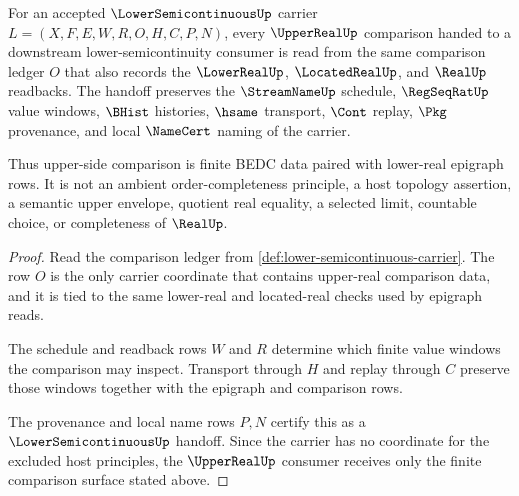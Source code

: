 \begin{theorem}
\label{thm:lowersemicontinuous-upperreal-handoff}
For an accepted $\LowerSemicontinuousUp$ carrier
$L=(X,F,E,W,R,O,H,C,P,N)$, every $\UpperRealUp$ comparison handed to a
downstream lower-semicontinuity consumer is read from the same comparison
ledger $O$ that also records the $\LowerRealUp$, $\LocatedRealUp$, and
$\RealUp$ readbacks. The handoff preserves the $\StreamNameUp$ schedule,
$\RegSeqRatUp$ value windows, $\BHist$ histories, $\hsame$ transport, $\Cont$
replay, $\Pkg$ provenance, and local $\NameCert$ naming of the carrier.

Thus upper-side comparison is finite BEDC data paired with lower-real
epigraph rows. It is not an ambient order-completeness principle, a host
topology assertion, a semantic upper envelope, quotient real equality, a
selected limit, countable choice, or completeness of $\RealUp$.
\end{theorem}
\begin{proof}
Read the comparison ledger from
\autoref{def:lower-semicontinuous-carrier}. The row $O$ is the only carrier
coordinate that contains upper-real comparison data, and it is tied to the
same lower-real and located-real checks used by epigraph reads.

The schedule and readback rows $W$ and $R$ determine which finite value
windows the comparison may inspect. Transport through $H$ and replay through
$C$ preserve those windows together with the epigraph and comparison rows.

The provenance and local name rows $P,N$ certify this as a
$\LowerSemicontinuousUp$ handoff. Since the carrier has no coordinate for the
excluded host principles, the $\UpperRealUp$ consumer receives only the
finite comparison surface stated above.
\end{proof}

